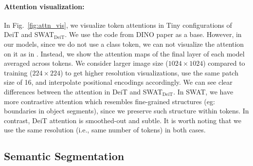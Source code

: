 \documentclass[10pt,twocolumn,letterpaper]{article}
\newcommand{\fref}[1]{Fig.~\ref{#1}}
\begin{document}
\paragraph{Attention visualization:} In \fref{fig:attn_vis}, we visualize token attentions in Tiny configurations of DeiT \cite{touvron2021deit} and SWAT$_\text{DeiT}$. We use the code from DINO \cite{caron2021emerging} paper as a base. However, in our models, since we do not use a class token, we can not visualize the attention on it as in \cite{caron2021emerging}. Instead, we show the attention maps of the final layer of each model averaged across tokens. We consider larger image size ($1024\times1024$) compared to training ($224\times224$) to get higher resolution visualizations, use the same patch size of 16, and interpolate positional encodings accordingly. We can see clear differences between the attention in DeiT \cite{touvron2021deit} and SWAT$_\text{DeiT}$. In SWAT, we have more contrastive attention which resembles fine-grained structures (eg: boundaries in object segments), since we preserve such structure within tokens. In contrast, DeiT attention is smoothed-out and subtle. It is worth noting that we use the same resolution (i.e., same number of tokens) in both cases.

\vspace{-4mm}
\subsection{Semantic Segmentation}
\label{subsec:multithumos}
\vspace{-1mm}
\end{document}
